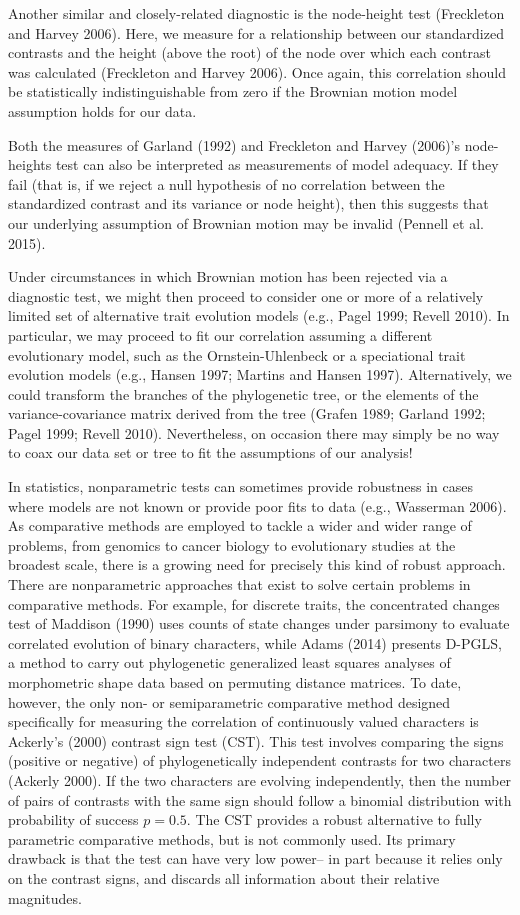 \documentclass[fleqn,10pt,lineno]{wlpeerj} %
\begin{document}
Another similar and closely-related diagnostic is the node-height test (Freckleton and Harvey 2006). Here, we measure for a relationship between our standardized contrasts and the height (above the root) of the node over which each contrast was calculated (Freckleton and Harvey 2006). Once again, this correlation should be statistically indistinguishable from zero if the Brownian motion model assumption holds for our data.

Both the measures of Garland (1992) and Freckleton and Harvey (2006)'s node-heights test can also be interpreted as measurements of model adequacy. If they fail (that is, if we reject a null hypothesis of no correlation between the standardized contrast and its variance or node height), then this suggests that our underlying assumption of Brownian motion may be invalid (Pennell et al. 2015).

Under circumstances in which Brownian motion has been rejected via a diagnostic test, we might then proceed to consider one or more of a relatively limited set of alternative trait evolution models (e.g., Pagel 1999; Revell 2010). In particular, we may proceed to fit our correlation assuming a different evolutionary model, such as the Ornstein-Uhlenbeck or a speciational trait evolution models (e.g., Hansen 1997; Martins and Hansen 1997). Alternatively, we could transform the branches of the phylogenetic tree, or the elements of the variance-covariance matrix derived from the tree (Grafen 1989; Garland 1992; Pagel 1999; Revell 2010). Nevertheless, on occasion there may simply be no way to coax our data set or tree to fit the assumptions of our analysis!

In statistics, nonparametric tests can sometimes provide robustness in cases where models are not known or provide poor fits to data (e.g., Wasserman 2006). As comparative methods are employed to tackle a wider and wider range of problems, from genomics to cancer biology to evolutionary studies at the broadest scale, there is a growing need for precisely this kind of robust approach. There are nonparametric approaches that exist to solve certain problems in comparative methods. For example, for discrete traits, the concentrated changes test of Maddison (1990) uses counts of state changes under parsimony to evaluate correlated evolution of binary characters, while Adams (2014) presents D-PGLS, a method to carry out phylogenetic generalized least squares analyses of morphometric shape data based on permuting distance matrices. To date, however, the only non- or semiparametric comparative method designed specifically for measuring the correlation of continuously valued characters is Ackerly's (2000) contrast sign test (CST). This test involves comparing the signs (positive or negative) of phylogenetically independent contrasts for two characters (Ackerly 2000). If the two characters are evolving independently, then the number of pairs of contrasts with the same sign should follow a binomial distribution with probability of success \(p=0.5\). The CST provides a robust alternative to fully parametric comparative methods, but is not commonly used. Its primary drawback is that the test can have very low power-- in part because it relies only on the contrast signs, and discards all information about their relative magnitudes.
\end{document}
